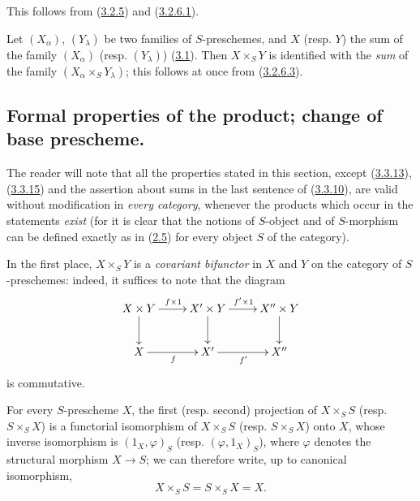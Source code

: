 This follows from (\hyperref[I.3.2.5]{3.2.5}) and
(\hyperref[I.3.2.6.1]{3.2.6.1}).

\begin{env}[3.2.8]
\label{I.3.2.8}
Let $(X_\alpha)$, $(Y_\lambda)$ be two families of $S$-preschemes, and $X$
(resp. $Y$) the sum of the family $(X_\alpha)$ (resp. $(Y_\lambda)$)
(\hyperref[subsection:I.3.1]{3.1}). Then $X\times_S Y$ is identified with the
\emph{sum} of the family $(X_\alpha\times_S Y_\lambda)$; this follows
at once from (\hyperref[I.3.2.6.3]{3.2.6.3}).
\end{env}

\subsection{Formal properties of the product; change of base prescheme.}
\label{subsection:I.3.3}

\begin{env}[3.3.1]
\label{I.3.3.1}
The reader will note that all the properties stated in this section,
except (\hyperref[I.3.3.13]{3.3.13}), (\hyperref[I.3.3.15]{3.3.15}) and the assertion about sums in the last sentence of
(\hyperref[I.3.3.10]{3.3.10}), are valid without modification in
\emph{every category}, whenever the products which occur in
the statements \emph{exist} (for it is clear that the notions of $S$-object and
of $S$-morphism can be defined exactly as in
(\hyperref[subsection:I.2.5]{2.5}) for every object $S$ of the category).
\end{env}

\begin{env}[3.3.2]
\label{I.3.3.2}
In the first place, $X\times_S Y$ is a \emph{covariant bifunctor} in $X$ and
$Y$ on the category of $S$-preschemes: indeed, it suffices to note
that the diagram
\[
  \xymatrix{
    X\times Y\ar[r]^{f\times 1}\ar[d] &
    X'\times Y\ar[r]^{f'\times 1}\ar[d] &
    X''\times Y\ar[d]\\
    X\ar[r]_f & X'\ar[r]_{f'} & X''
  }
\]
is commutative.
\end{env}

\begin{proposition}[3.3.3]
\label{I.3.3.3}
For every $S$-prescheme $X$, the first \textup{(resp.} second) projection of
$X\times_S S$ \textup{(resp. $S\times_S X$)} is a functorial isomorphism of
$X\times_S S$ \textup{(resp. $S\times_S X$)} onto $X$, whose inverse isomorphism
is $(1_X,\varphi)_S$ \textup{(resp. $(\varphi,1_X)_S$)}, where $\varphi$ denotes
the structural morphism $X\to S$; we can therefore write, up to canonical
isomorphism,
\[
  X\times_S S=S\times_S X=X.
\]
\end{proposition}

